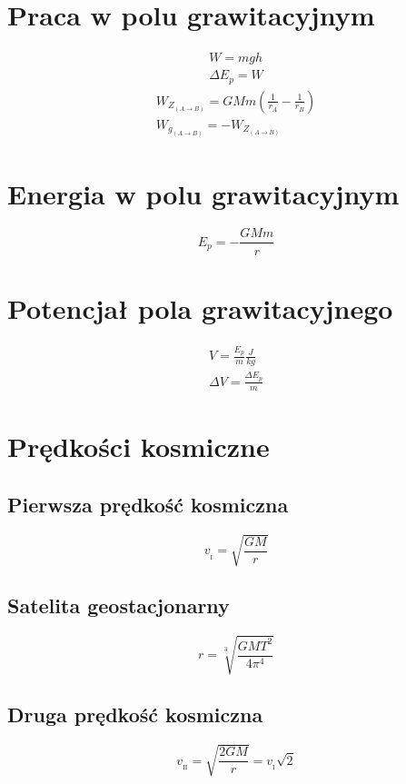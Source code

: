   \section{Praca w polu grawitacyjnym}
    \begin{gather}
      W = mgh\\
      \Delta E_p = W
    \end{gather}
    \begin{gather}
      W_{Z_{(A\rightarrow B)}} = GMm\left(\frac{1}{r_A} - \frac{1}{r_B}\right)\\
      W_{g_{(A\rightarrow B)}} = -W_{Z_{(A\rightarrow B)}}
    \end{gather}
  \section{Energia w polu grawitacyjnym}
    \begin{equation}
      E_p = -\frac{GMm}{r}
    \end{equation}
  \section{Potencjał pola grawitacyjnego}
    \begin{gather}
      V = \frac{E_p}{m} \unit{\frac{J}{kg}}\\
      \Delta V = \frac{\Delta E_p}{m}
    \end{gather}
  \section{Prędkości kosmiczne}
    \subsection{Pierwsza prędkość kosmiczna}
      \begin{equation}
        v_{{}_\mathrm{I}} = \sqrt{\frac{GM}{r}}
      \end{equation}
    \subsection{Satelita geostacjonarny}
      \begin{equation}
        r = \sqrt[3]{\frac{GMT^2}{4\pi^4}}
      \end{equation}
    \subsection{Druga prędkość kosmiczna}
      \begin{equation}
        v_{{}_\mathrm{II}} = \sqrt{\frac{2GM}{r}} = v_{{}_\mathrm{I}}\sqrt{2}
      \end{equation}
